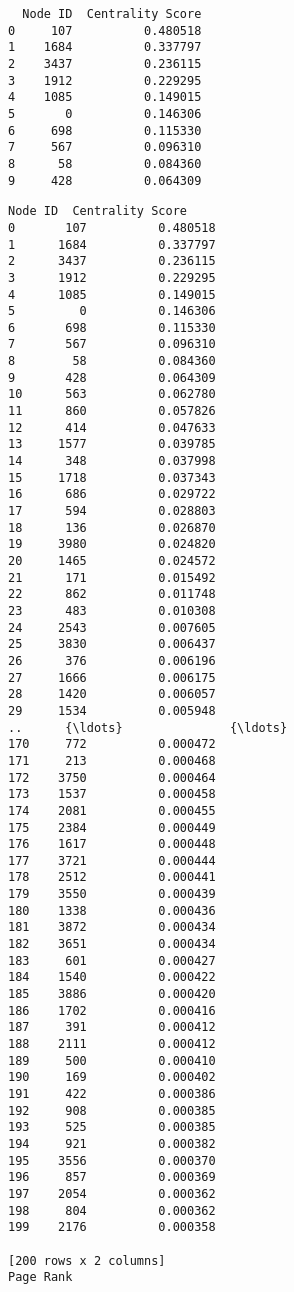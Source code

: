 \documentclass[11pt]{article}
\begin{document}
    
    \begin{verbatim}
  Node ID  Centrality Score
0     107          0.480518
1    1684          0.337797
2    3437          0.236115
3    1912          0.229295
4    1085          0.149015
5       0          0.146306
6     698          0.115330
7     567          0.096310
8      58          0.084360
9     428          0.064309
    \end{verbatim}

    
    \begin{Verbatim}[commandchars=\\\{\}]
    Node ID  Centrality Score
0       107          0.480518
1      1684          0.337797
2      3437          0.236115
3      1912          0.229295
4      1085          0.149015
5         0          0.146306
6       698          0.115330
7       567          0.096310
8        58          0.084360
9       428          0.064309
10      563          0.062780
11      860          0.057826
12      414          0.047633
13     1577          0.039785
14      348          0.037998
15     1718          0.037343
16      686          0.029722
17      594          0.028803
18      136          0.026870
19     3980          0.024820
20     1465          0.024572
21      171          0.015492
22      862          0.011748
23      483          0.010308
24     2543          0.007605
25     3830          0.006437
26      376          0.006196
27     1666          0.006175
28     1420          0.006057
29     1534          0.005948
..      {\ldots}               {\ldots}
170     772          0.000472
171     213          0.000468
172    3750          0.000464
173    1537          0.000458
174    2081          0.000455
175    2384          0.000449
176    1617          0.000448
177    3721          0.000444
178    2512          0.000441
179    3550          0.000439
180    1338          0.000436
181    3872          0.000434
182    3651          0.000434
183     601          0.000427
184    1540          0.000422
185    3886          0.000420
186    1702          0.000416
187     391          0.000412
188    2111          0.000412
189     500          0.000410
190     169          0.000402
191     422          0.000386
192     908          0.000385
193     525          0.000385
194     921          0.000382
195    3556          0.000370
196     857          0.000369
197    2054          0.000362
198     804          0.000362
199    2176          0.000358

[200 rows x 2 columns]
Page Rank

    \end{Verbatim}
\end{document}
